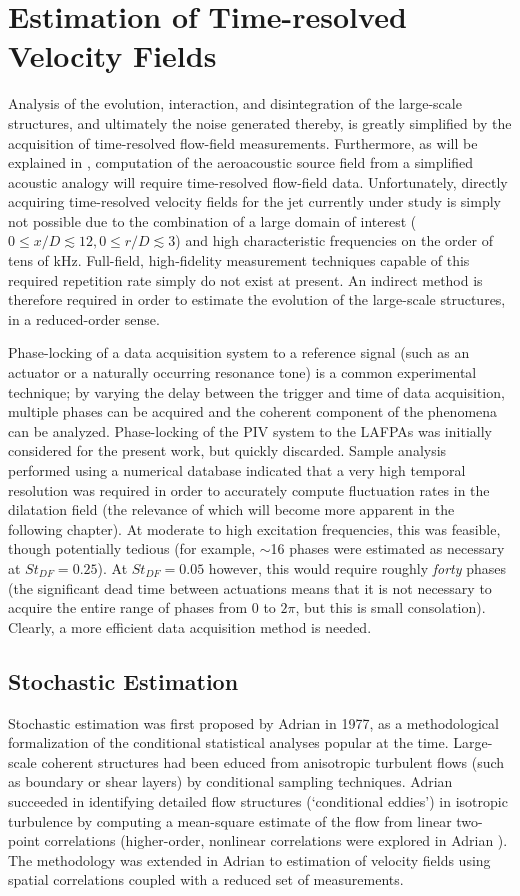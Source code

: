\chapter{Estimation of Time-resolved Velocity Fields}
\label{sect:velocity}
Analysis of the evolution, interaction, and disintegration of the large-scale structures, and ultimately the noise generated thereby, is greatly simplified by the acquisition of time-resolved flow-field measurements.
Furthermore, as will be explained in , computation of the aeroacoustic source field from a simplified acoustic analogy will require time-resolved flow-field data.
Unfortunately, directly acquiring time-resolved velocity fields for the jet currently under study is simply not possible due to the combination of a large domain of interest ($0 \leq x/D \lesssim 12, 0 \leq r/D \lesssim 3$) and high characteristic frequencies on the order of tens of kHz.
Full-field, high-fidelity measurement techniques capable of this required repetition rate simply do not exist at present.
An indirect method is therefore required in order to estimate the evolution of the large-scale structures, in a reduced-order sense.

Phase-locking of a data acquisition system to a reference signal (such as an actuator or a naturally occurring resonance tone) is a common experimental technique; by varying the delay between the trigger and time of data acquisition, multiple phases can be acquired and the coherent component of the phenomena can be analyzed.
Phase-locking of the PIV system to the LAFPAs was initially considered for the present work, but quickly discarded.
Sample analysis performed using a numerical database indicated that a very high temporal resolution was required in order to accurately compute fluctuation rates in the dilatation field (the relevance of which will become more apparent in the following chapter).
At moderate to high excitation frequencies, this was feasible, though potentially tedious (for example, $\sim$16 phases were estimated as necessary at $St_{DF} =0.25$).
At $St_{DF} =0.05$ however, this would require roughly \textit{forty} phases (the significant dead time between actuations means that it is not necessary to acquire the entire range of phases from $0$ to $2\pi$, but this is small consolation).
Clearly, a more efficient data acquisition method is needed.
\section{Stochastic Estimation}
Stochastic estimation was first proposed by Adrian \citep{Adrian1977} in 1977, as a methodological formalization of the conditional statistical analyses popular at the time. 
Large-scale coherent structures had been educed from anisotropic turbulent flows (such as boundary or shear layers) by conditional sampling techniques.
Adrian succeeded in identifying detailed flow structures (`conditional eddies') in isotropic turbulence by computing a mean-square estimate of the flow from linear two-point correlations (higher-order, nonlinear correlations were explored in Adrian \citep{Adrian1979}). 
The methodology was extended in Adrian \citep{Adrian1994} to estimation of velocity fields using spatial correlations coupled with a reduced set of measurements.

